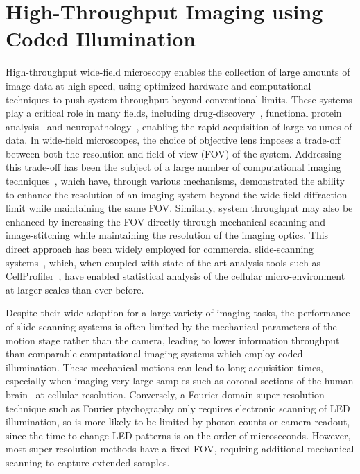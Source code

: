 \chapter{High-Throughput Imaging using Coded Illumination}\label{ch:highthroughput}

High-throughput wide-field microscopy enables the collection of large amounts of image data at high-speed, using optimized hardware and computational techniques to push system throughput beyond conventional limits. These systems play a critical role in many fields, including drug-discovery~\cite{Perlman1194, brodin2011high, bickle2010beautiful}, functional protein analysis~\cite{Liebel:03, huh2003global} and neuropathology~\cite{peiffer1979alcohol, remmelinck2000could, alegro2017automating}, enabling the rapid acquisition of large volumes of data. In wide-field microscopes, the choice of objective lens imposes a trade-off between both the resolution and field of view (FOV) of the system. Addressing this trade-off has been the subject of a large number of computational imaging techniques~\cite{Zheng2013, betzig2006imaging, Rust:06, gustafsson2000surpassing, rodenburg2004phase, Tian2014}, which have, through various mechanisms, demonstrated the ability to enhance the resolution of an imaging system beyond the wide-field diffraction limit while maintaining the same FOV. Similarly, system throughput may also be enhanced by increasing the FOV directly through mechanical scanning and image-stitching while maintaining the resolution of the imaging optics. This direct approach has been widely employed for commercial slide-scanning systems~\cite{zeissSlideScan}, which, when coupled with state of the art analysis tools such as CellProfiler~\cite{Carpenter2006}, have enabled statistical analysis of the cellular micro-environment at larger scales than ever before.

Despite their wide adoption for a large variety of imaging tasks, the performance of slide-scanning systems is often limited by the mechanical parameters of the motion stage rather than the camera, leading to lower information throughput than comparable computational imaging systems which employ coded illumination. These mechanical motions can lead to long acquisition times, especially when imaging very large samples such as coronal sections of the human brain~\cite{Grinberg2007} at cellular resolution. Conversely, a Fourier-domain super-resolution technique such as Fourier ptychography only requires electronic scanning of LED illumination, so is more likely to be limited by photon counts or camera readout, since the time to change LED patterns is on the order of microseconds. However, most super-resolution methods have a fixed FOV, requiring additional mechanical scanning to capture extended samples.

